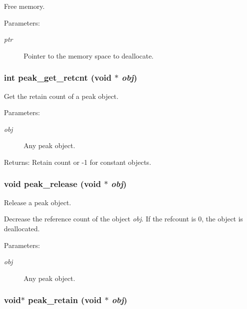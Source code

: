Free memory. 

\begin{Desc}
\item[Parameters:]
\begin{description}
\item[{\em ptr}]Pointer to the memory space to deallocate. \end{description}
\end{Desc}
\hypertarget{group__alloc_ga8}{
\subsubsection[peak\_\-get\_\-retcnt]{\setlength{\rightskip}{0pt plus 5cm}int peak\_\-get\_\-retcnt (void $\ast$ {\em obj})}}
\label{group__alloc_ga8}


Get the retain count of a peak object. 

\begin{Desc}
\item[Parameters:]
\begin{description}
\item[{\em obj}]Any peak object.\end{description}
\end{Desc}
\begin{Desc}
\item[Returns:]Retain count or -1 for constant objects. \end{Desc}
\hypertarget{group__alloc_ga7}{
\subsubsection[peak\_\-release]{\setlength{\rightskip}{0pt plus 5cm}void peak\_\-release (void $\ast$ {\em obj})}}
\label{group__alloc_ga7}


Release a peak object. 

Decrease the reference count of the object {\em obj\/}. If the refcount is 0, the object is deallocated.

\begin{Desc}
\item[Parameters:]
\begin{description}
\item[{\em obj}]Any peak object. \end{description}
\end{Desc}
\hypertarget{group__alloc_ga6}{
\subsubsection[peak\_\-retain]{\setlength{\rightskip}{0pt plus 5cm}void$\ast$ peak\_\-retain (void $\ast$ {\em obj})}}
\label{group__alloc_ga6}


